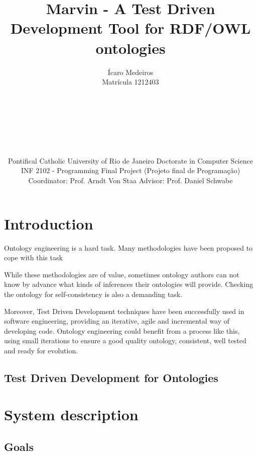 \documentclass{report}
\begin{document}
\title{Marvin - A Test Driven Development Tool for RDF/OWL ontologies}
\author{
Ícaro Medeiros\\
Matrícula 1212403
\\ \\ \\ \\ \\ \\ \\ \\
Pontifical Catholic University of Rio de Janeiro
Doctorate in Computer Science
INF 2102 - Programming Final Project (Projeto final de Programação)
Coordinator: Prof. Arndt Von Staa
Advisor: Prof. Daniel Schwabe
}

\maketitle
\tableofcontents

\chapter{Introduction}

Ontology engineering is a hard task. Many methodologies have been proposed
to cope with this task %


While these methodologies are of value, sometimes ontology authors
can not know by advance what kinds of inferences their ontologies will
provide. Checking the ontology for self-consistency is also a demanding task.

Moreover, Test Driven Development techniques have been successfully used in
software engineering, providing an iterative, agile and incremental way of developing
code. Ontology engineering could benefit from a process like this, using small iterations
to ensure a good quality ontology, consistent, well tested and ready for evolution.

\section{Test Driven Development for Ontologies}


\chapter{System description}

\section{Goals}
\end{document}
